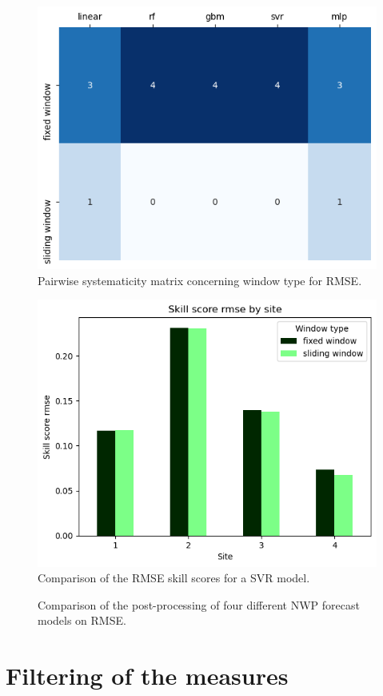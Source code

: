 \begin{figure}[htb!]
    \centering
    \includegraphics[width=\columnwidth]{figures/first_study/comp_window_rmse.png}
\caption{Pairwise systematicity matrix concerning window type for RMSE.}
\end{figure}

\begin{figure}[htb!]
    \centering
    \includegraphics[width=\columnwidth]{figures/first_study/comp_window_rmse_mlp.png}
\caption{Comparison of the RMSE skill scores for a SVR model.}
\end{figure}

\begin{figure}[htb!]
    \centering
    
\caption{Comparison of the post-processing of four different NWP forecast models on RMSE.}
\end{figure}

\section{Filtering of the measures}
